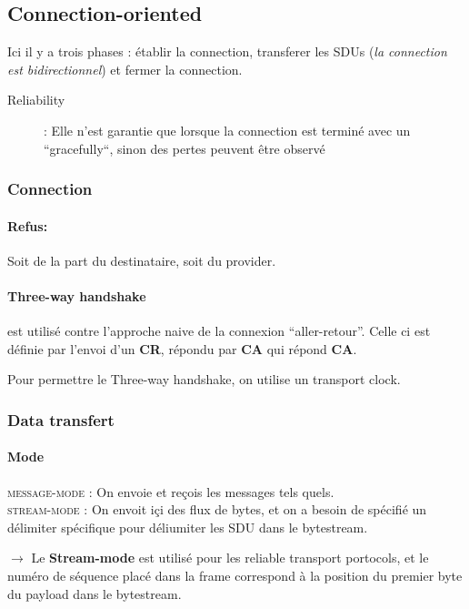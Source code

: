 \documentclass{report}
\begin{document}
\subsection{Connection-oriented}
Ici il y a trois phases : établir la connection, transferer les SDUs (\textit{la connection est 
bidirectionnel}) et fermer la connection.

\begin{description}
    \item[Reliability] : Elle n'est garantie que lorsque la connection est terminé avec un
        ``gracefully``, sinon des pertes peuvent être observé
\end{description}

\subsubsection{Connection}

\paragraph{Refus:} Soit de la part du destinataire, soit du provider.

\paragraph{Three-way handshake} est utilisé contre l'approche naive de la connexion ``aller-retour''. Celle ci est définie par l'envoi d'un \textbf{CR}, répondu par \textbf{CA} qui répond \textbf{CA}.

Pour permettre le Three-way handshake, on utilise un transport clock.


\subsubsection{Data transfert}

\paragraph{Mode}
\textsc{message-mode} : On envoie et reçois les messages tels quels.\\
\textsc{stream-mode} : On envoit içi des flux de bytes, et on a besoin de spécifié un délimiter
spécifique pour déliumiter les SDU dans le bytestream.

$\rightarrow$  Le \textbf{Stream-mode}  est utilisé  pour les  reliable
transport portocols,  et le  numéro de séquence  placé dans  la frame
correspond à la position du premier byte du payload dans le bytestream.
\end{document}
